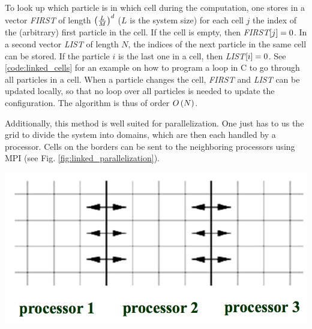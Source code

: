 To look up which particle is in which cell during the computation, one stores in a vector \emph{FIRST} of length $\left(\frac{L}{M}\right)^d$ ($L$ is the system size) for each cell $j$ the index of the (arbitrary) first particle in the cell. If the cell is empty, then \emph{FIRST}$\left[j\right]=0$. In a second vector \emph{LIST} of length $N$, the indices of the next particle in the same cell can be stored. If the particle $i$ is the last one in a cell, then \emph{LIST}$\left[i\right]=0$. See \ref{code:linked_cells} for an example on how to program a loop in C to go through all particles in a cell. When a particle changes the cell, \emph{FIRST} and \emph{LIST} can be updated locally, so that no loop over all particles is needed to update the configuration. The algorithm is thus of order $O\left(N\right)$.

Additionally, this method is well suited for parallelization. One just has to us the grid to divide the system into domains, which are then each handled by a processor. Cells on the borders can be sent to the neighboring processors using MPI (see Fig. \ref{fig:linked_parallelization}).


\vspace{0.2cm}
\noindent
\begin{minipage}{\textwidth}
\begin{minipage}{\textwidth}
  \centering
  \includegraphics[width=.85\textwidth]{pics/linked_parallelization}
  \label{fig:linked_parallelization}
\end{minipage}
\end{minipage}
\vspace{0.1cm}









